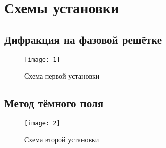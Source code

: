 \documentclass{../tools/letask}
\begin{document}
\section{Схемы установки}
\subsection{Дифракция на фазовой решётке}
\begin{figure}[H]
\centering
\texttt{[image: 1]}
\caption{Схема первой установки}
\end{figure}
\subsection{Метод тёмного поля}
\begin{figure}[H]
\centering
\texttt{[image: 2]}
\caption{Схема второй установки}
\end{figure}
\end{document}
